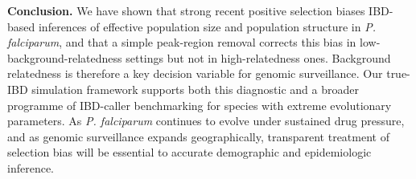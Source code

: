 \documentclass[11pt]{article}
\begin{document}
\textbf{Conclusion.} We have shown that strong recent positive selection biases IBD-based inferences of effective population size and population structure in \textit{P. falciparum}, and that a simple peak-region removal corrects this bias in low-background-relatedness settings but not in high-relatedness ones. Background relatedness is therefore a key decision variable for genomic surveillance. Our true-IBD simulation framework supports both this diagnostic and a broader programme of IBD-caller benchmarking for species with extreme evolutionary parameters. As \textit{P. falciparum} continues to evolve under sustained drug pressure, and as genomic surveillance expands geographically, transparent treatment of selection bias will be essential to accurate demographic and epidemiologic inference.



\end{document}
